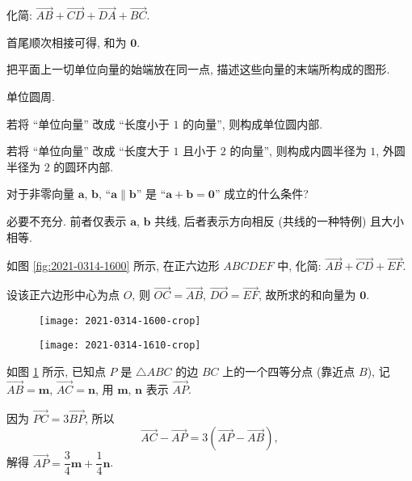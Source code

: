 \lianxi
\begin{exercise}
    化简: $\overrightarrow{AB}+ \overrightarrow{CD}
    + \overrightarrow{DA}+ \overrightarrow{BC}$.
\end{exercise}
\beginsolution
    首尾顺次相接可得, 和为 $\bm{0}$.
\endsolution

\begin{exercise}
    把平面上一切单位向量的始端放在同一点, 描述这些向量的末端所构成的图形.
\end{exercise}
\beginsolution
    单位圆周.

    \varexercise 若将 ``单位向量'' 改成 ``长度小于 $1$ 的向量'', 则构成单位圆内部.
    
    \varexercise 若将 ``单位向量'' 改成 ``长度大于 $1$ 且小于 $2$ 的向量'', 则构成内圆半径为 $1$, 外圆半径为 $2$ 的圆环内部.
\endsolution

\begin{exercise}
    对于非零向量 $\bm{a}$, $\bm{b}$, ``$\bm{a}\parallel\bm{b}$'' 
    是 ``$\bm{a}+\bm{b}=\bm{0}$'' 成立的什么条件?
\end{exercise}
\beginsolution
    必要不充分. 前者仅表示 $\bm{a}$, $\bm{b}$ 共线, 后者表示方向相反 (共线的一种特例) 且大小相等.
\endsolution

\begin{exercise}
    如图 \ref{fig:2021-0314-1600} 所示, 在正六边形 $ABCDEF$ 中, 化简: $\overrightarrow{AB}+ \overrightarrow{CD}+ \overrightarrow{EF}$.
\end{exercise}
\beginsolution
    设该正六边形中心为点 $O$, 则 $\overrightarrow{OC}= \overrightarrow{AB}$, $\overrightarrow{DO}= \overrightarrow{EF}$, 故所求的和向量为 $\bm{0}$.
\endsolution

\begin{figure}[htb]
    \small
    \centering
    \begin{minipage}[b]{0.45\linewidth}
        \centering
        \texttt{[image: 2021-0314-1600-crop]}
        \caption{}\label{fig:2021-0314-1600}
    \end{minipage}
    \hskip 0.5cm%
    \begin{minipage}[b]{0.45\linewidth}
        \centering
        \texttt{[image: 2021-0314-1610-crop]}
        \caption{}\label{fig:2021-0314-1610}
    \end{minipage}
\end{figure}

\begin{exercise}
    如图 \ref{fig:2021-0314-1610} 所示, 已知点 $P$ 是 $\triangle ABC$ 的边 $BC$ 上的一个四等分点 (靠近点 $B$), 记 $\overrightarrow{AB}=\bm{m}$, $\overrightarrow{AC}=\bm{n}$, 用 $\bm{m}$, $\bm{n}$ 表示 $\overrightarrow{AP}$.
\end{exercise}
\beginsolution
    因为 $\overrightarrow{PC}= 3\overrightarrow{BP}$, 所以
    \[\overrightarrow{AC}- \overrightarrow{AP}
    = 3(\overrightarrow{AP}- \overrightarrow{AB}),\]
    解得 $\overrightarrow{AP}= \dfrac34\bm{m}+ \dfrac14\bm{n}$.
\endsolution

